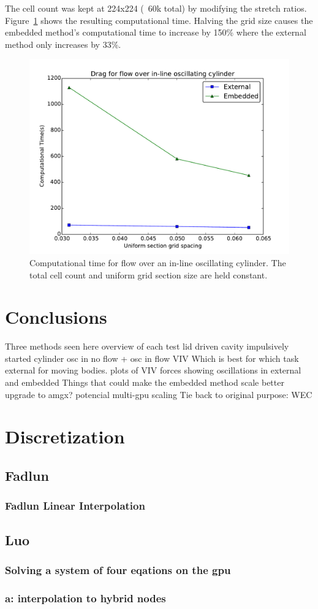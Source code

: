 The cell count was kept at 224x224 (~60k total) by modifying the stretch ratios. 
Figure~\ref{fig:performance2} shows the resulting computational time. 
Halving the grid size causes the embedded method's computational time to increase by 150\% where the external method only increases by 33\%.
\begin{figure}[!htb]
	\centering
	\includegraphics[width=0.4\linewidth]{performance_oscflow2}
	\caption{Computational time for flow over an in-line oscillating cylinder. The total cell count and uniform grid section size are held constant.}
	\label{fig:performance2}
\end{figure}

\chapter{Conclusions} 
Three methods seen here 
overview of each test 
	lid driven cavity 
	impulsively started cylinder 
	osc in no flow + osc in flow 
	VIV 
Which is best for which task
	external for moving bodies.
	plots of VIV forces showing oscillations in external and embedded
	Things that could make the embedded method scale better
		upgrade to amgx?
	potencial multi-gpu scaling
Tie back to original purpose: WEC




\appendix
\chapter{Discretization}
\section{Fadlun}
\subsection{Fadlun Linear Interpolation}\label{Fadlun Linear Interpolation}
\section{Luo}
\subsection{Solving a system of four eqations on the gpu}\label{system of euqations}
\subsection{a: interpolation to hybrid nodes}
\label{a: interpolation to hybrid nodes}


